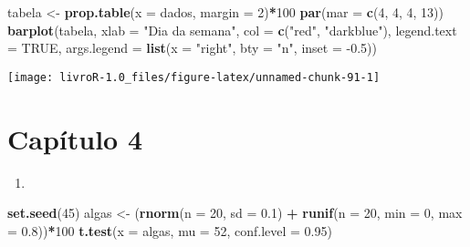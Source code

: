 \documentclass[14pt,titlepage, oneside, openany, a4paper]{book}
\newenvironment{Shaded}{\begin{snugshade}}{\end{snugshade}}
\newcommand{\DataTypeTok}[1]{\textcolor[rgb]{0.13,0.29,0.53}{#1}}
\newcommand{\DecValTok}[1]{\textcolor[rgb]{0.00,0.00,0.81}{#1}}
\newcommand{\FloatTok}[1]{\textcolor[rgb]{0.00,0.00,0.81}{#1}}
\newcommand{\KeywordTok}[1]{\textcolor[rgb]{0.13,0.29,0.53}{\textbf{#1}}}
\newcommand{\NormalTok}[1]{#1}
\newcommand{\OperatorTok}[1]{\textcolor[rgb]{0.81,0.36,0.00}{\textbf{#1}}}
\newcommand{\OtherTok}[1]{\textcolor[rgb]{0.56,0.35,0.01}{#1}}
\newcommand{\StringTok}[1]{\textcolor[rgb]{0.31,0.60,0.02}{#1}}
\begin{document}
\begin{Shaded}
\begin{Highlighting}[]
\NormalTok{tabela <-}\StringTok{ }\KeywordTok{prop.table}\NormalTok{(}\DataTypeTok{x =}\NormalTok{ dados, }\DataTypeTok{margin =} \DecValTok{2}\NormalTok{)}\OperatorTok{*}\DecValTok{100}
\KeywordTok{par}\NormalTok{(}\DataTypeTok{mar =} \KeywordTok{c}\NormalTok{(}\DecValTok{4}\NormalTok{, }\DecValTok{4}\NormalTok{, }\DecValTok{4}\NormalTok{, }\DecValTok{13}\NormalTok{))}
\KeywordTok{barplot}\NormalTok{(tabela, }
        \DataTypeTok{xlab =} \StringTok{"Dia da semana"}\NormalTok{,}
        \DataTypeTok{col =} \KeywordTok{c}\NormalTok{(}\StringTok{"red"}\NormalTok{, }\StringTok{"darkblue"}\NormalTok{), }
        \DataTypeTok{legend.text =} \OtherTok{TRUE}\NormalTok{, }
        \DataTypeTok{args.legend =} \KeywordTok{list}\NormalTok{(}\DataTypeTok{x =} \StringTok{"right"}\NormalTok{, }\DataTypeTok{bty =} \StringTok{"n"}\NormalTok{, }\DataTypeTok{inset =} \FloatTok{-0.5}\NormalTok{))}
\end{Highlighting}
\end{Shaded}

\begin{center}\texttt{[image: livroR-1.0\_files/figure-latex/unnamed-chunk-91-1]} \end{center}

\hypertarget{capuxedtulo-4}{%
\section{Capítulo 4}\label{capuxedtulo-4}}

\begin{enumerate}
\def\labelenumi{\arabic{enumi})}
\item
\end{enumerate}

\begin{Shaded}
\begin{Highlighting}[]
\KeywordTok{set.seed}\NormalTok{(}\DecValTok{45}\NormalTok{)}
\NormalTok{algas <-}\StringTok{ }\NormalTok{(}\KeywordTok{rnorm}\NormalTok{(}\DataTypeTok{n =} \DecValTok{20}\NormalTok{, }\DataTypeTok{sd =} \FloatTok{0.1}\NormalTok{) }\OperatorTok{+}\StringTok{ }\KeywordTok{runif}\NormalTok{(}\DataTypeTok{n =} \DecValTok{20}\NormalTok{, }\DataTypeTok{min =} \DecValTok{0}\NormalTok{, }\DataTypeTok{max =} \FloatTok{0.8}\NormalTok{))}\OperatorTok{*}\DecValTok{100}
\KeywordTok{t.test}\NormalTok{(}\DataTypeTok{x =}\NormalTok{ algas, }\DataTypeTok{mu =} \DecValTok{52}\NormalTok{, }\DataTypeTok{conf.level =} \FloatTok{0.95}\NormalTok{)}
\end{Highlighting}
\end{Shaded}
\end{document}
